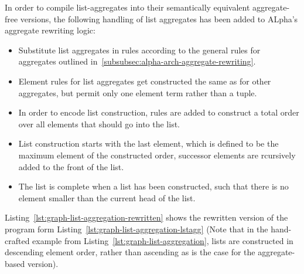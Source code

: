 In order to compile list-aggregates into their semantically equivalent aggregate-free versions, the following handling of list aggregates has been added to ALpha's aggregate rewriting logic:
\begin{itemize}
    \item Substitute list aggregates in rules according to the general rules for aggregates outlined in~\ref{subsubsec:alpha-arch-aggregate-rewriting}.
    \item Element rules for list aggregates get constructed the same as for other aggregates, but permit only one element term rather than a tuple.
    \item In order to encode list construction, rules are added to construct a total order over all elements that should go into the list.
    \item List construction starts with the last element, which is defined to be the maximum element of the constructed order, successor elements are rcursively added to the front of the list.
    \item The list is complete when a list has been constructed, such that there is no element smaller than the current head of the list.
\end{itemize}
Listing~\ref{lst:graph-list-aggregation-rewritten} shows the rewritten version of the program form Listing~\ref{lst:graph-list-aggregation-lstagg} (Note that in the hand-crafted example from Listing~\ref{lst:graph-list-aggregation}, lists are constructed in descending element order, rather than ascending as is the case for the aggregate-based version).
